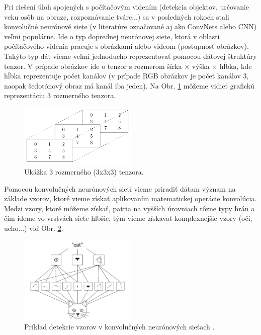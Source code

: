 Pri riešení úloh spojených s počítačovým videním (detekcia objektov, určovanie veku
osôb na obraze, rozpoznávanie tváre...) sa v posledných rokoch stali konvolučné neurónové siete (v literatúre označované aj ako ConvNets alebo CNN) veľmi populárne.
Ide o typ doprednej neurónovej siete, ktorá v oblasti počítačového videnia
pracuje s obrázkami alebo videom (postupnosť obrázkov). Takýto typ dát vieme veľmi
jednoducho reprezentovať pomocou dátovej štruktúry tenzor. V prípade obrázkov ide o
tenzor s rozmerom šírka × výška × hĺbka, kde hĺbka reprezentuje počet kanálov (v prípade RGB obrázkov je počet kanálov 3, naopak šedotónový obraz má kanál iba jeden). Na Obr. \ref{fig:tenzor} môžeme vidieť grafickú reprezentáciu 3 rozmerného tenzora.

\begin{figure}[H]
\centerline{\includegraphics[width=0.5\textwidth]{images/tenzor.png}}
\caption{Ukážka 3 rozmerného (3x3x3) tenzora.}
\label{fig:tenzor}
\end{figure}

Pomocou konvolučných neurónových sietí vieme priradiť dátam význam na základe
vzorov, ktoré vieme získať aplikovaním matematickej operácie konvolúcia. Medzi vzory,
ktoré môžeme získať, patria na vyšších úrovniach rôzne typy hrán a čím ideme vo
vrstvách siete hlbšie, tým vieme získavať komplexnejšie vzory (oči, ucho...) viď Obr. \ref{fig:detekcia_vzorov}.

\begin{figure}[H]
\centerline{\includegraphics[width=0.5\textwidth]{images/detekcia vzorov.jpg}}
\caption{Príklad detekcie vzorov v konvolučných neurónových sieťach \cite{donahue2017dance}.}
\label{fig:detekcia_vzorov}
\end{figure}

